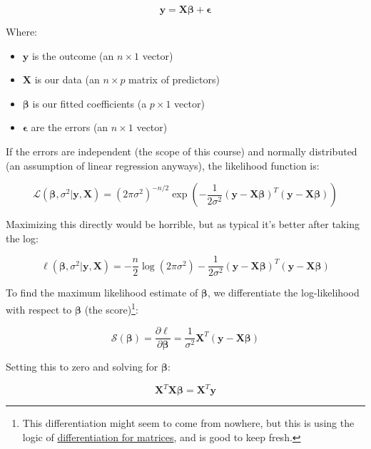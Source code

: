 \documentclass{article}
\begin{document}
\begin{equation}
\mathbf{y} = \mathbf{X}\bm{\beta} + \bm{\epsilon}
\end{equation}

Where:
\begin{itemize}
    \item $\mathbf{y}$ is the outcome (an $n \times 1$ vector)
    \item $\mathbf{X}$ is our data (an $n \times p$ matrix of predictors)
    \item $\bm{\beta}$ is our fitted coefficients (a $p \times 1$ vector)
    \item $\bm{\epsilon}$ are the errors (an $n \times 1$ vector)
\end{itemize}

If the errors are independent (the scope of this course) and normally distributed (an assumption of linear regression anyways), the likelihood function is:

\begin{equation}
\mathcal{L}(\bm{\beta}, \sigma^2|\mathbf{y},\mathbf{X}) = (2\pi\sigma^2)^{-n/2} \exp\left(-\frac{1}{2\sigma^2}(\mathbf{y} - \mathbf{X}\bm{\beta})^T(\mathbf{y} - \mathbf{X}\bm{\beta})\right)
\end{equation}

Maximizing this directly would be horrible, but as typical it's better after taking the log:

\begin{equation}
\ell(\bm{\beta}, \sigma^2|\mathbf{y},\mathbf{X}) = -\frac{n}{2}\log(2\pi\sigma^2) - \frac{1}{2\sigma^2}(\mathbf{y} - \mathbf{X}\bm{\beta})^T(\mathbf{y} - \mathbf{X}\bm{\beta})
\end{equation}

To find the maximum likelihood estimate of $\bm{\beta}$, we differentiate the log-likelihood with respect to $\bm{\beta}$ (the score)\footnote{This differentiation might seem to come from nowhere, but this is using the logic of \href{https://www2.imm.dtu.dk/pubdb/pubs/3274-full.html}{differentiation for matrices}, and is good to keep fresh.}:

\begin{equation}
\mathcal{S}(\boldsymbol{\beta}) = \frac{\partial \ell}{\partial \bm{\beta}} = \frac{1}{\sigma^2}\mathbf{X}^T(\mathbf{y} - \mathbf{X}\bm{\beta})
\end{equation}

Setting this to zero and solving for $\bm{\beta}$:

\begin{equation}
\mathbf{X}^T\mathbf{X}\bm{\beta} = \mathbf{X}^T\mathbf{y}
\end{equation}
\end{document}
